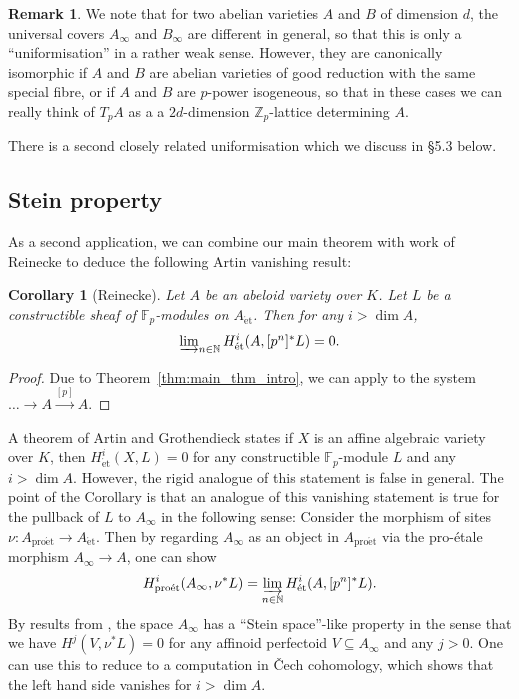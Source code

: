 \documentclass[10pt,oneside]{amsart}
\newtheorem{corollary}[theorem]{Corollary}
\theoremstyle{definition}
\newtheorem{remark}[theorem]{Remark}
\newcommand{\et}{\operatorname{\acute{e}t}}
\newcommand{\proet}{\operatorname{pro\acute{e}t}}
\newcommand{\N}{\mathbb{N}}
\begin{document}
	\begin{center}
	\end{center}
	\begin{remark}
	We note that for two abelian varieties $A$ and $B$ of dimension $d$, the universal covers $A_\infty$ and $B_\infty$ are different in general, so that this is only a ``uniformisation'' in a rather weak sense. However, they are canonically isomorphic if $A$ and $B$ are abelian varieties of good reduction with the same special fibre, or if $A$ and $B$ are $p$-power isogeneous, so that in these cases we can really think of $T_pA$ as a a $2d$-dimension $\mathbb Z_p$-lattice determining $A$.
	\end{remark}
	 There is a second closely related uniformisation which we discuss in \S5.3 below.
	\subsection{Stein property}
	As a second application, we can combine our main theorem with work of Reinecke to deduce the following Artin vanishing result:
	\begin{corollary}[Reinecke]
		Let $A$ be an abeloid variety over $K$. Let $L$ be a constructible sheaf of $\mathbb F_p$-modules on $A_{\et}$. Then for any $i>\dim A$,
		\[\textstyle\varinjlim_{n\in \mathbb N}H_{\et}^i(A,[p^n]^{\ast}L)=0.\]
	\end{corollary}
	\begin{proof}
	Due to Theorem~\ref{thm:main_thm_intro}, we can apply \cite[Theorem 3.3]{Reinecke} to the system $\dots \rightarrow A\xrightarrow{[p]}A$.
	\end{proof}
	A theorem of Artin and Grothendieck states if $X$ is an affine algebraic variety over $K$, then $H_{\et}^i(X,L)=0$ for any constructible $\mathbb F_p$-module $L$ and any $i>\dim A$. However, the rigid analogue of this statement is false in general. The point of the Corollary is that an analogue of this vanishing statement is true for the pullback of $L$ to $A_\infty$ in the following sense: Consider the morphism of sites $\nu\colon A_{\proet}\to A_{\et}$. Then by regarding $A_\infty$ as an object in $A_{\proet}$ via the pro-\'etale morphism $A_\infty\to A$, one can show
	\[H^i_{\proet}(A_\infty,\nu^{\ast}L)=\varinjlim_{n\in\N} H^i_{\et}(A,[p^n]^{\ast}L). \]
	By results from \cite{p-adic_Hodge}, the space $A_\infty$ has a ``Stein space''-like property in the sense that we have $H^j(V,\nu^{\ast}L)=0$ for any affinoid perfectoid $V\subseteq A_\infty$ and any $j>0$. One can use this to reduce to a computation in \v{C}ech cohomology, which shows that the left hand side vanishes for $i>\dim A$.
\end{document}
